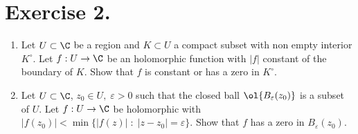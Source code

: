 \section*{Exercise 2.}

\begin{enumerate}[label = (\alph*)]
    \item Let $U\subset \C$ be a region and $K\subset U$ a compact subset with non empty interior $K^\circ$. Let $f: U \to \C$ be an holomorphic function with $|f|$ constant of the boundary of $K$. Show that $f$ is constant or has a zero in $K^\circ$.
    \item Let $U \subset \C$, $z_0 \in U,\; \varepsilon > 0$ such that the closed ball $\ol{B_\varepsilon(z_0)}$ is a subset of $U$. Let $f: U \to \C$ be holomorphic with $|f(z_0)| < \min\{|f(z)| \;:\; |z-z_0| = \varepsilon\}$. Show that $f$ has a zero in $B_\varepsilon(z_0)$.
\end{enumerate}